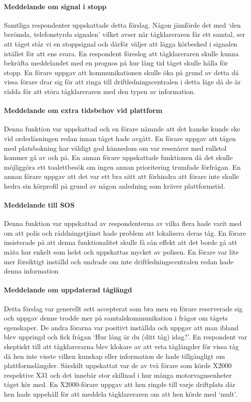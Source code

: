 \paragraph{Meddelande om signal i stopp}
Samtliga respondenter uppskattade detta förslag.
Någon jämförde det med \lq{}den berömda, telefonstyrda signalen\rq{} vilket avser när tågklareraren får ett samtal, ser att tåget står vi en stoppsignal och därför väljer att lägga körbesked i signalen istället för att ens svara.
En respondent föreslog att tågklareraren skulle kunna bekräfta meddelandet med en prognos på hur lång tid tåget skulle hålla för stopp.
En förare uppgav att kommunikationen skulle öka på grund av detta då vissa förare drar sig för att ringa till driftledningscentralen i detta läge då de är rädda för att störa tågklareraren med den typen av information.
\paragraph{Meddelande om extra tidsbehov vid plattform}
Denna funktion var uppskattad och en förare nämnde att det kanske kunde ske vid orderläsningen redan innan tåget hade avgått.
En förare uppgav att tågen med platsbokning har väldigt god kännedom om var resenärer med rullstol kommer gå av och på.
En annan förare uppskattade funktionen då det skulle möjliggöra ett toalettbesök om ingen annan prioritering trumfade förfrågan.
En annan förare uppgav att det var ett bra sätt att förhindra att förare inte skulle hedra sin körprofil på grund av någon anledning som kräver plattformstid.
\paragraph{Meddelande till SOS}
Denna funktion var uppskattad av respondenterna av vilka flera hade varit med om att polis och räddningstjänst hade problem att lokalisera deras tåg.
En förare insisterade på att denna funktionalitet skulle få sån effekt att det borde gå att mäta hur enkelt som helst och uppskattas mycket av polisen.
En förare var lite mer försiktigt inställd och undrade om inte driftledningscentralen redan hade denna information
\paragraph{Meddelande om uppdaterad tåglängd}
Detta förslag var generellt sett accepterat som bra men en förare reserverade sig och uppgav denne trodde mer på samtalskommunikation i frågor om tågets egenskaper.
De andra förarna var positivt inställda och uppgav att man ibland blev uppringd och fick frågan \lq{}Hur lång är du (ditt tåg) idag?\rq{}.
En respondent var skeptiskt till att tågklarerarna blev klokare av att veta tåglängder för vissa tåg då hen inte visste vilken kunskap eller information de hade tillgängligt om plattformslängder.
Särskilt uppskattat var de av två förare som körde X2000 respektive X31 och det innebär stor skillnad i hur många motorvagnsenheter tåget kör med.
En X2000-förare uppgav att hen ringde till varje driftplats där hen hade uppehåll för att meddela tågklareraren om att hen körde med \lq{}mult\rq{}.
